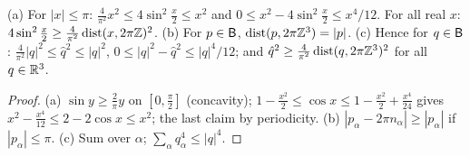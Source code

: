 \begin{lemma}[elementary]\label{lem:a05:el}
\textup{(a)} For $|x|\le\pi$: $\frac4{\pi^2}x^2\le4\sin^2\frac x2\le x^2$ and $0\le x^2-4\sin^2\frac x2\le x^4/12$. For all real $x$: $4\sin^2\frac x2\ge\frac4{\pi^2}\operatorname{dist}(x,2\pi\mathbb Z)^2$. \textup{(b)} For $p\in\mathsf B$, $\operatorname{dist}(p,2\pi\mathbb Z^3)=|p|$. \textup{(c)} Hence for $q\in\mathsf B$: $\frac4{\pi^2}|q|^2\le\hat q^2\le|q|^2$, $0\le|q|^2-\hat q^2\le|q|^4/12$; and $\hat q^2\ge\frac4{\pi^2}\operatorname{dist}(q,2\pi\mathbb Z^3)^2$ for all $q\in\mathbb R^3$.
\end{lemma}
\begin{proof}
(a) $\sin y\ge\frac2\pi y$ on $[0,\frac\pi2]$ (concavity); $1-\frac{x^2}2\le\cos x\le1-\frac{x^2}2+\frac{x^4}{24}$ gives $x^2-\frac{x^4}{12}\le2-2\cos x\le x^2$; the last claim by periodicity. (b) $|p_\alpha-2\pi n_\alpha|\ge|p_\alpha|$ if $|p_\alpha|\le\pi$. (c) Sum over $\alpha$; $\sum_\alpha q_\alpha^4\le|q|^4$.
\end{proof}

